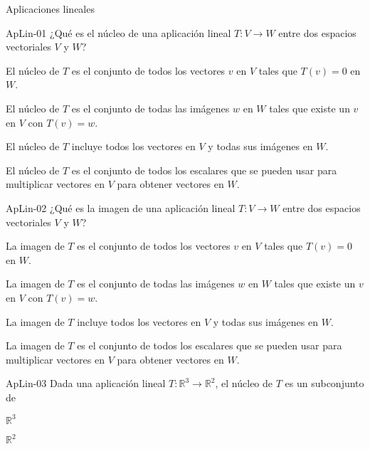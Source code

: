 \documentclass[a4,11pt]{aleph-notas}
\begin{document}
\begin{quiz}{Aplicaciones lineales}

\begin{multi}[]%
    {ApLin-01}
    ¿Qué es el núcleo de una aplicación lineal \( T: V \rightarrow W \) entre dos espacios vectoriales \( V \) y \( W \)?
    \item* El núcleo de \( T \) es el conjunto de todos los vectores \( v \) en \( V \) tales que \( T(v) = 0 \) en \( W \).
    \item El núcleo de \( T \) es el conjunto de todas las imágenes \( w \) en \( W \) tales que existe un \( v \) en \( V \) con \( T(v) = w \).
    \item El núcleo de \( T \) incluye todos los vectores en \( V \) y todas sus imágenes en \( W \).
    \item El núcleo de \( T \) es el conjunto de todos los escalares que se pueden usar para multiplicar vectores en \( V \) para obtener vectores en \( W \).
\end{multi}

\begin{multi}[]%
    {ApLin-02}
    ¿Qué es la imagen de una aplicación lineal \( T: V \rightarrow W \) entre dos espacios vectoriales \( V \) y \( W \)?
    \item La imagen de \( T \) es el conjunto de todos los vectores \( v \) en \( V \) tales que \( T(v) = 0 \) en \( W \).
    \item* La imagen de \( T \) es el conjunto de todas las imágenes \( w \) en \( W \) tales que existe un \( v \) en \( V \) con \( T(v) = w \).
    \item La imagen de \( T \) incluye todos los vectores en \( V \) y todas sus imágenes en \( W \).
    \item La imagen de \( T \) es el conjunto de todos los escalares que se pueden usar para multiplicar vectores en \( V \) para obtener vectores en \( W \).
\end{multi}

\begin{multi}[]%
    {ApLin-03}
    Dada una aplicación lineal \( T: \mathbb{R}^3 \rightarrow \mathbb{R}^2 \), el núcleo de $T$ es un subconjunto de
    \item* $\mathbb{R}^3$
    \item $\mathbb{R}^2$
\end{multi}


\end{quiz}
\end{document}
